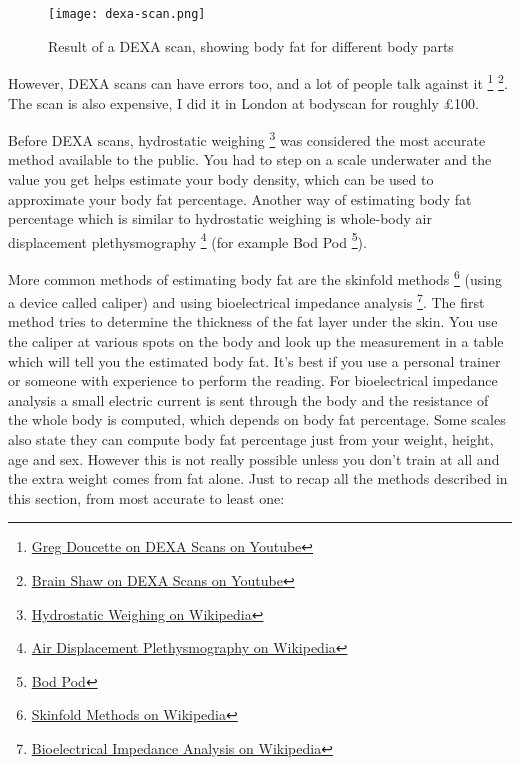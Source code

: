 \documentclass[openany, 12pt]{book}
\begin{document}
	\begin{figure}[h]
		\centering
		\texttt{[image: dexa-scan.png]}
		\caption{Result of a DEXA scan, showing body fat for different body parts}
	\end{figure}
        
        However, DEXA scans can have errors too, and a lot of people talk against it
        \footnote{\href{https://www.youtube.com/watch?v=2Gg4Jm5KS1Y}{Greg Doucette on DEXA Scans on Youtube}}
        \footnote{\href{https://www.youtube.com/watch?v=P17bcpYE8Ew}{Brain Shaw on DEXA Scans on Youtube}}. The scan is also expensive, I did it in London at bodyscan for roughly \pounds 100.
	
	Before DEXA scans, hydrostatic weighing
        \footnote{\href{https://en.wikipedia.org/wiki/Hydrostatic_weighing}{Hydrostatic Weighing on Wikipedia}} was considered the most accurate method
        available to the public. You had to step on a scale underwater and the value you get helps estimate your body density, which can be used to approximate your body fat percentage.
        Another way of estimating body fat percentage which is similar to hydrostatic weighing is whole-body air displacement plethysmography
        \footnote{\href{https://en.wikipedia.org/wiki/Air_displacement_plethysmography}{Air Displacement Plethysmography on Wikipedia}} (for example Bod Pod
        \footnote{\href{https://www.cosmed.com/en/products/body-composition/bod-pod}{Bod Pod}}).
	
	More common methods of estimating body fat are the skinfold methods
        \footnote{\href{https://en.wikipedia.org/wiki/Body_fat_percentage\#Anthropometric_methods}{Skinfold Methods on Wikipedia}}
        (using a device called caliper) and using bioelectrical impedance analysis
        \footnote{\href{https://en.wikipedia.org/wiki/Bioelectrical_impedance_analysis}{Bioelectrical Impedance Analysis on Wikipedia}}.
        The first method tries to determine the thickness of the fat layer under the skin. You use the caliper at various spots on the body and look up the measurement in
        a table which will tell you the estimated body fat. It's best if you use a personal trainer or someone with experience to perform the reading. For bioelectrical impedance analysis a small
        electric current is sent through the body and the resistance of the whole body is computed, which depends on body fat percentage. Some scales also state they can compute body fat percentage
        just from your weight, height, age and sex. However this is not really possible unless you don't train at all and the extra weight comes from fat alone. Just to recap all the methods
        described in this section, from most accurate to least one:
	
\end{document}
